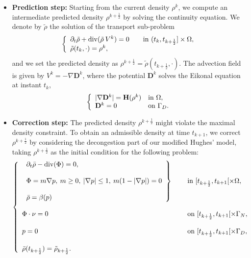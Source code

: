 \documentclass[final,reqno]{amsart}
\theoremstyle{plain}
\theoremstyle{definition}
\theoremstyle{remark}
\numberwithin{remark}{section}	%
\numberwithin{example}{section}	%
\DeclareMathOperator{\dive}{div}
\newcommand{\de}{\mathbf{D}}
\newcommand{\he}{\mathbf{H}}
\newcommand{\Om}{\Omega}
\begin{document}
\begin{itemize}
	\item \textbf{Prediction step:} Starting from the current density $\rho^k$, we compute an intermediate predicted density $\rho^{k+\frac{1}{2}}$ by solving the continuity equation. We denote by $\tilde{\rho}$ the solution of the transport sub-problem
	\begin{equation}\label{H11}
		\left\{
		\begin{array}{ll}			
			\partial_t \tilde{\rho} + \dive(\tilde{\rho}\: V^k ) = 0 \quad & \hbox{in } (t_k, t_{k+\frac{1}{2}}] \times \Omega, \\ 
			\tilde{\rho}(t_{k}, \cdot) = \rho^k,
		\end{array}
		\right.
	\end{equation}
	and we set the predicted density as $\rho^{k+\frac{1}{2}} = \tilde{\rho}(t_{k+\frac{1}{2}}, \cdot)$. The advection field is given by $V^k=-\nabla \de^k$, where the potential $\de^k$ solves the Eikonal equation at instant $t_k$,
	\begin{equation}
	\left\lbrace\begin{array}{ll}
		\vert \nabla \de^k \vert = \he(\rho^k) & \hbox{in }\Om,\\ 
		\de^k = 0 & \hbox{on } \Gamma_D.
	\end{array}
	\right.
	\end{equation}

	\item \textbf{Correction step:} The predicted density $\rho^{k+\frac{1}{2}}$ might violate the maximal density constraint. To obtain an admissible density at time $t_{k+1}$, we correct $\rho^{k+\frac{1}{2}}$ by considering the decongestion part of our modified Hughes' model, taking $\rho^{k+\frac{1}{2}}$ as the initial condition for the following problem:
	 	\begin{equation} \label{eq_hu}	\left\{
		\begin{array}{ll}
			\left. 	\begin{array}{l}
				\partial_t\bar{\rho} -\dive(\Phi)  =0,   \\  \\
				\Phi=m \nabla p, \: m\geq0, \: \vert \nabla p\vert \leq 1,\:  m(1-\vert \nabla p\vert)=0\\   \\
				\bar{\rho}  =   \beta(p) 
			\end{array} \right\}  \quad & \hbox{ in } [t_{k+\frac{1}{2}},t_{k+1}[ \times \Omega,\\  \\
			\Phi \cdot \nu =0  & \hbox{ on }[t_{k+\frac{1}{2}},t_{k+1}[ \times\Gamma_N,\\  \\
			p=0   & \hbox{ on }[t_{k+\frac{1}{2}},t_{k+1}[ \times\Gamma_D, \\ \\
			\bar{\rho}(t_{k+\frac{1}{2}})=\tilde{\rho}_{k+\frac{1}{2}}.
		\end{array}
		\right.
	\end{equation} 

\end{itemize}
\end{document}
